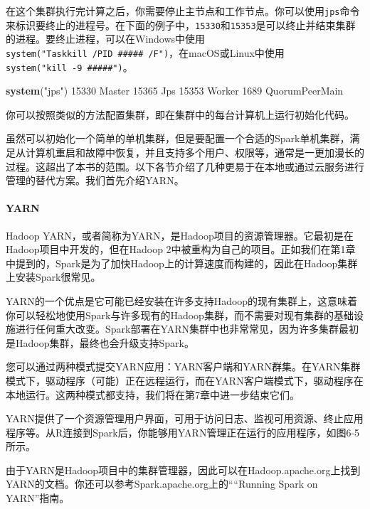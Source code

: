 \documentclass[
]{article}
\newenvironment{Shaded}{\begin{snugshade}}{\end{snugshade}}
\newcommand{\DecValTok}[1]{\textcolor[rgb]{0.00,0.00,0.81}{#1}}
\newcommand{\KeywordTok}[1]{\textcolor[rgb]{0.13,0.29,0.53}{\textbf{#1}}}
\newcommand{\NormalTok}[1]{#1}
\newcommand{\StringTok}[1]{\textcolor[rgb]{0.31,0.60,0.02}{#1}}
\begin{document}
在这个集群执行完计算之后，你需要停止主节点和工作节点。你可以使用\texttt{jps}命令来标识要终止的进程号。在下面的例子中，\texttt{15330}和\texttt{15353}是可以终止并结束集群的进程。要终止进程，可以在Windows中使用\texttt{system("Taskkill\ /PID\ \#\#\#\#\#\ /F")}，在macOS或Linux中使用\texttt{system("kill\ -9\ \#\#\#\#\#")}。

\begin{Shaded}
\begin{Highlighting}[]
\KeywordTok{system}\NormalTok{(}\StringTok{"jps"}\NormalTok{)}
\DecValTok{15330}\NormalTok{ Master}
\DecValTok{15365}\NormalTok{ Jps}
\DecValTok{15353}\NormalTok{ Worker}
\DecValTok{1689}\NormalTok{ QuorumPeerMain}
\end{Highlighting}
\end{Shaded}

你可以按照类似的方法配置集群，即在集群中的每台计算机上运行初始化代码。

虽然可以初始化一个简单的单机集群，但是要配置一个合适的Spark单机集群，满足从计算机重启和故障中恢复，并且支持多个用户、权限等，通常是一更加漫长的过程。这超出了本书的范围。以下各节介绍了几种更易于在本地或通过云服务进行管理的替代方案。我们首先介绍YARN。

\hypertarget{yarn}{%
\paragraph{YARN}\label{yarn}}

Hadoop
YARN，或者简称为YARN，是Hadoop项目的资源管理器。它最初是在Hadoop项目中开发的，但在Hadoop
2中被重构为自己的项目。正如我们在第1章中提到的，Spark是为了加快Hadoop上的计算速度而构建的，因此在Hadoop集群上安装Spark很常见。

YARN的一个优点是它可能已经安装在许多支持Hadoop的现有集群上，这意味着你可以轻松地使用Spark与许多现有的Hadoop集群，而不需要对现有集群的基础设施进行任何重大改变。Spark部署在YARN集群中也非常常见，因为许多集群最初是Hadoop集群，最终也会升级支持Spark。

您可以通过两种模式提交YARN应用：YARN客户端和YARN群集。在YARN集群模式下，驱动程序（可能）正在远程运行，而在YARN客户端模式下，驱动程序在本地运行。这两种模式都支持，我们将在第7章中进一步结束它们。

YARN提供了一个资源管理用户界面，可用于访问日志、监视可用资源、终止应用程序等。从R连接到Spark后，你能够用YARN管理正在运行的应用程序，如图6-5所示。

由于YARN是Hadoop项目中的集群管理器，因此可以在Hadoop.apache.org上找到YARN的文档。你还可以参考Spark.apache.org上的````Running
Spark on YARN''指南。
\end{document}
